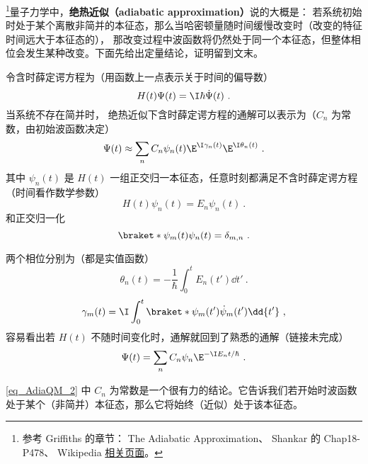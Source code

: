 
\begin{issues}
\issueTODO
\end{issues}


\footnote{参考 Griffiths\cite{GriffE} 的章节： The Adiabatic Approximation、 Shankar\cite{Shankar} 的 Chap18-P478、 Wikipedia \href{https://en.wikipedia.org/wiki/Adiabatic_theorem}{相关页面}。}量子力学中，\textbf{绝热近似（adiabatic approximation）}说的大概是： 若系统初始时处于某个离散非简并的本征态，那么当哈密顿量随时间缓慢改变时（改变的特征时间远大于本征态的）， 那改变过程中波函数将仍然处于同一个本征态，但整体相位会发生某种改变。下面先给出定量结论，证明留到文末。

令含时薛定谔方程为（用函数上一点表示关于时间的偏导数）
\begin{equation}
H(t)\Psi(t) = \I\hbar\dot\Psi(t)~.
\end{equation}
当系统不存在简并时， 绝热近似下含时薛定谔方程的通解可以表示为（$C_n$ 为常数，由初始波函数决定）
\begin{equation}\label{eq_AdiaQM_2}
\Psi(t) \approx \sum_n C_n \psi_n(t) \E^{\I\gamma_n(t)}\E^{\I\theta_n(t)}~.
\end{equation}
其中 $\psi_n(t)$ 是 $H(t)$ 一组正交归一本征态，任意时刻都满足不含时薛定谔方程（时间看作数学参数）
\begin{equation}\label{eq_AdiaQM_3}
H(t)\psi_n(t) = E_n\psi_n(t)~.
\end{equation}
和正交归一化
\begin{equation}\label{eq_AdiaQM_6}
\braket*{\psi_m(t)}{\psi_n(t)} = \delta_{m,n}~.
\end{equation}

两个相位分别为（都是实值函数）
\begin{equation}
\theta_n(t) = -\frac{1}{\hbar} \int_0^t E_n(t')\dd{t'}~.
\end{equation}
\begin{equation}
\gamma_m(t) = \I\int_0^t \braket*{\psi_m(t')}{\dot\psi_m(t')}\dd{t'}~,
\end{equation}
容易看出若 $H(t)$ 不随时间变化时，通解就回到了熟悉的通解（链接未完成）
\begin{equation}
\Psi(t) = \sum_n C_n \psi_n \E^{-\I E_n t/\hbar}~.
\end{equation}

\autoref{eq_AdiaQM_2} 中 $C_n$ 为常数是一个很有力的结论。它告诉我们若开始时波函数处于某个（非简并）本征态，那么它将始终（近似）处于该本征态。

